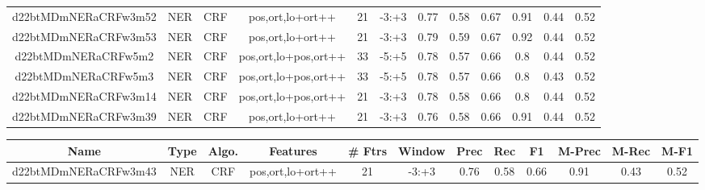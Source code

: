 \documentclass[a4paper]{article}
\begin{document}
\begin{landscape}
\begin{center}
\begin{tabular}{ |c|c|c|c|c|c|c|c|c|c|c|c|}
 
 	
 	\small{ d22btMDmNERaCRFw3m52 } & \small{ NER} & \small{  CRF }  & pos,ort,lo+ort++  &  21 &  \small{  -3:+3 }  &  0.77 & 0.58 & 0.67  &  0.91 & 0.44 & 0.52 \\
 	

 
 	
 	\small{ d22btMDmNERaCRFw3m53 } & \small{ NER} & \small{  CRF }  & pos,ort,lo+ort++  &  21 &  \small{  -3:+3 }  &  0.79 & 0.59 & 0.67  &  0.92 & 0.44 & 0.52 \\
 	

 
 	
 	\small{ d22btMDmNERaCRFw5m2 } & \small{ NER} & \small{  CRF }  & pos,ort,lo+pos,ort++  &  33 &  \small{  -5:+5 }  &  0.78 & 0.57 & 0.66  &  0.8 & 0.44 & 0.52 \\
 	

 
 	
 	\small{ d22btMDmNERaCRFw5m3 } & \small{ NER} & \small{  CRF }  & pos,ort,lo+pos,ort++  &  33 &  \small{  -5:+5 }  &  0.78 & 0.57 & 0.66  &  0.8 & 0.43 & 0.52 \\
 	

 
 	
 	\small{ d22btMDmNERaCRFw3m14 } & \small{ NER} & \small{  CRF }  & pos,ort,lo+pos,ort++  &  21 &  \small{  -3:+3 }  &  0.78 & 0.58 & 0.66  &  0.8 & 0.44 & 0.52 \\
 	

 
 	
 	\small{ d22btMDmNERaCRFw3m39 } & \small{ NER} & \small{  CRF }  & pos,ort,lo+ort++  &  21 &  \small{  -3:+3 }  &  0.76 & 0.58 & 0.66  &  0.91 & 0.44 & 0.52 \\
 	
 \hline
\end{tabular}
\end{center}




\begin{center}
\begin{tabular}{ |c|c|c|c|c|c|c|c|c|c|c|c|} 
 \hline
 	Name & Type & Algo. & Features & \# Ftrs & Window & Prec & Rec & F1 & M-Prec & M-Rec & M-F1\\
 \hline

 	

 
 	
 	\small{ d22btMDmNERaCRFw3m43 } & \small{ NER} & \small{  CRF }  & pos,ort,lo+ort++  &  21 &  \small{  -3:+3 }  &  0.76 & 0.58 & 0.66  &  0.91 & 0.43 & 0.52 \\
 	


\end{tabular}
\end{center}
\end{landscape}
\end{document}
